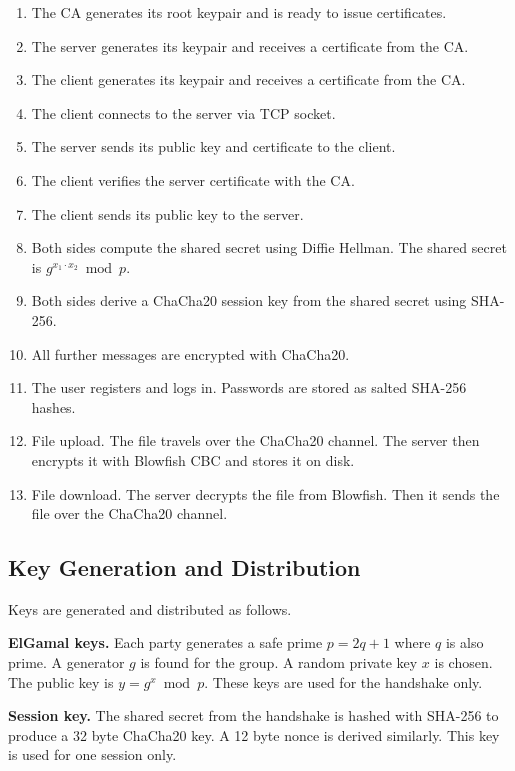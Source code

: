 \documentclass[12pt,a4paper]{article}
\begin{document}
\begin{enumerate}
    \item The CA generates its root keypair and is ready to issue certificates.
    \item The server generates its keypair and receives a certificate from the CA.
    \item The client generates its keypair and receives a certificate from the CA.
    \item The client connects to the server via TCP socket.
    \item The server sends its public key and certificate to the client.
    \item The client verifies the server certificate with the CA.
    \item The client sends its public key to the server.
    \item Both sides compute the shared secret using Diffie Hellman. The shared secret is $g^{x_1 \cdot x_2} \bmod p$.
    \item Both sides derive a ChaCha20 session key from the shared secret using SHA-256.
    \item All further messages are encrypted with ChaCha20.
    \item The user registers and logs in. Passwords are stored as salted SHA-256 hashes.
    \item File upload. The file travels over the ChaCha20 channel. The server then encrypts it with Blowfish CBC and stores it on disk.
    \item File download. The server decrypts the file from Blowfish. Then it sends the file over the ChaCha20 channel.
\end{enumerate}

\subsection{Key Generation and Distribution}

Keys are generated and distributed as follows.

\textbf{ElGamal keys.} Each party generates a safe prime $p = 2q + 1$ where $q$ is also prime. A generator $g$ is found for the group. A random private key $x$ is chosen. The public key is $y = g^x \bmod p$. These keys are used for the handshake only.

\textbf{Session key.} The shared secret from the handshake is hashed with SHA-256 to produce a 32 byte ChaCha20 key. A 12 byte nonce is derived similarly. This key is used for one session only.
\end{document}
